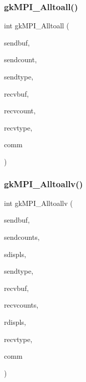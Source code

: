 \subsubsection{\texorpdfstring{gk\+M\+P\+I\+\_\+\+Alltoall()}{gkMPI\_Alltoall()}}
{\footnotesize\ttfamily int gk\+M\+P\+I\+\_\+\+Alltoall (\begin{DoxyParamCaption}\item[{void $\ast$}]{sendbuf,  }\item[{\hyperlink{a00876_aaa5262be3e700770163401acb0150f52}{idx\+\_\+t}}]{sendcount,  }\item[{M\+P\+I\+\_\+\+Datatype}]{sendtype,  }\item[{void $\ast$}]{recvbuf,  }\item[{\hyperlink{a00876_aaa5262be3e700770163401acb0150f52}{idx\+\_\+t}}]{recvcount,  }\item[{M\+P\+I\+\_\+\+Datatype}]{recvtype,  }\item[{M\+P\+I\+\_\+\+Comm}]{comm }\end{DoxyParamCaption})}

\mbox{\label{a00359_ae0651b090fd2a6a021996fc1998a429c}} 
\subsubsection{\texorpdfstring{gk\+M\+P\+I\+\_\+\+Alltoallv()}{gkMPI\_Alltoallv()}}
{\footnotesize\ttfamily int gk\+M\+P\+I\+\_\+\+Alltoallv (\begin{DoxyParamCaption}\item[{void $\ast$}]{sendbuf,  }\item[{\hyperlink{a00876_aaa5262be3e700770163401acb0150f52}{idx\+\_\+t} $\ast$}]{sendcounts,  }\item[{\hyperlink{a00876_aaa5262be3e700770163401acb0150f52}{idx\+\_\+t} $\ast$}]{sdispls,  }\item[{M\+P\+I\+\_\+\+Datatype}]{sendtype,  }\item[{void $\ast$}]{recvbuf,  }\item[{\hyperlink{a00876_aaa5262be3e700770163401acb0150f52}{idx\+\_\+t} $\ast$}]{recvcounts,  }\item[{\hyperlink{a00876_aaa5262be3e700770163401acb0150f52}{idx\+\_\+t} $\ast$}]{rdispls,  }\item[{M\+P\+I\+\_\+\+Datatype}]{recvtype,  }\item[{M\+P\+I\+\_\+\+Comm}]{comm }\end{DoxyParamCaption})}

